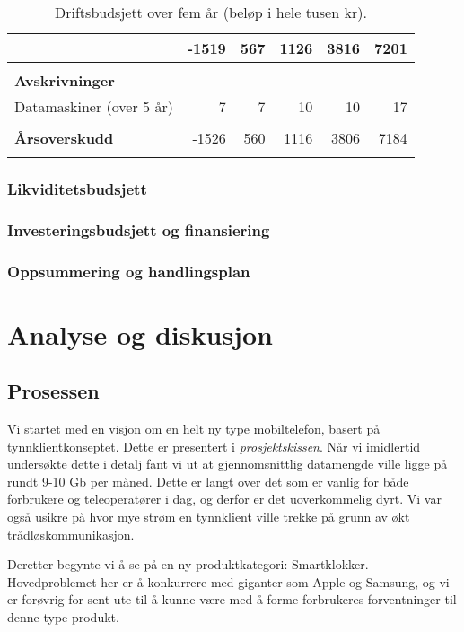 \begin{table}
\begin{tabular}{lrrrrr}
                                    & -1519 &  567 & 1126 &  3816 &  7201 \\
    \hline
    \\
    \textbf{Avskrivninger} \\
    Datamaskiner (over 5 år)        &     7 &    7 &   10 &    10 &    17 \\
    \\
    \textbf{Årsoverskudd}           & -1526 &  560 & 1116 &  3806 &  7184 \\
    \hline
    \\
  \end{tabular}
  \caption{Driftsbudsjett over fem år (beløp i hele tusen kr).}
  \label{table.driftsbudsjett}
\end{table}

\subsection{Likviditetsbudsjett}

\subsection{Investeringsbudsjett og finansiering}

\subsection{Oppsummering og handlingsplan}

\chapter{Analyse og diskusjon}

\section{Prosessen}
\label{prosessen}

Vi startet med en visjon om en helt ny type mobiltelefon, basert på
tynnklientkonseptet. Dette er presentert i \textit{prosjektskissen}. Når vi
imidlertid undersøkte dette i detalj fant vi ut at gjennomsnittlig datamengde
ville ligge på rundt 9-10 Gb per måned. Dette er langt over det som er vanlig
for både forbrukere og teleoperatører i dag, og derfor er det uoverkommelig
dyrt. Vi var også usikre på hvor mye strøm en tynnklient ville trekke på grunn
av økt trådløskommunikasjon.

Deretter begynte vi å se på en ny produktkategori: Smartklokker. Hovedproblemet
her er å konkurrere med giganter som Apple og Samsung, og vi er forøvrig for
sent ute til å kunne være med å forme forbrukeres forventninger til denne type
produkt.

